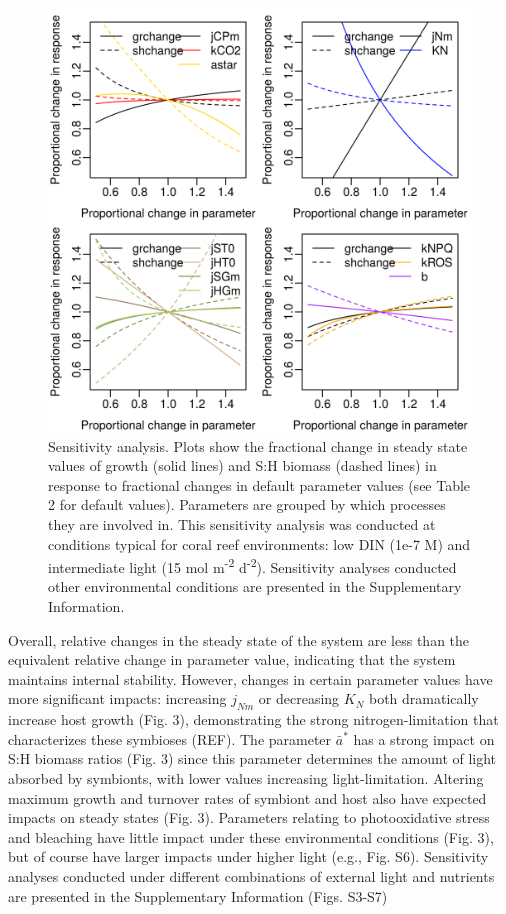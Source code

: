 \documentclass[]{elsarticle} %
\makeatletter
\def\maxwidth{\ifdim\Gin@nat@width>\linewidth\linewidth
\else\Gin@nat@width\fi}
\let\Oldincludegraphics\includegraphics
\renewcommand{\includegraphics}[1]{\Oldincludegraphics[width=\maxwidth]{#1}}
\makeatother
\begin{document}
\begin{figure}[htbp]
\centering
\includegraphics{../img/Fig3.png}
\caption{Sensitivity analysis. Plots show the fractional change in
steady state values of growth (solid lines) and S:H biomass (dashed
lines) in response to fractional changes in default parameter values
(see Table 2 for default values). Parameters are grouped by which
processes they are involved in. This sensitivity analysis was conducted
at conditions typical for coral reef environments: low DIN (1e-7 M) and
intermediate light (15 mol m\textsuperscript{-2} d\textsuperscript{-2}).
Sensitivity analyses conducted other environmental conditions are
presented in the Supplementary Information.}
\end{figure}

Overall, relative changes in the steady state of the system are less
than the equivalent relative change in parameter value, indicating that
the system maintains internal stability. However, changes in certain
parameter values have more significant impacts: increasing \(j_{Nm}\) or
decreasing \(K_N\) both dramatically increase host growth (Fig. 3),
demonstrating the strong nitrogen-limitation that characterizes these
symbioses (REF). The parameter \(\bar{a}^*\) has a strong impact on S:H
biomass ratios (Fig. 3) since this parameter determines the amount of
light absorbed by symbionts, with lower values increasing
light-limitation. Altering maximum growth and turnover rates of symbiont
and host also have expected impacts on steady states (Fig. 3).
Parameters relating to photooxidative stress and bleaching have little
impact under these environmental conditions (Fig. 3), but of course have
larger impacts under higher light (e.g., Fig. S6). Sensitivity analyses
conducted under different combinations of external light and nutrients
are presented in the Supplementary Information (Figs. S3-S7)
\end{document}
